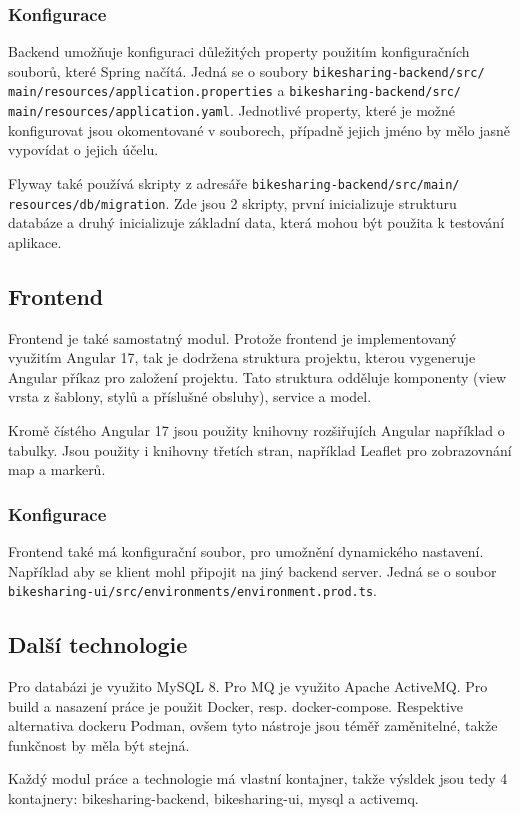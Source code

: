 \documentclass[12pt, letterpaper]{article}
\begin{document}
\subsubsection{Konfigurace}
Backend umožňuje konfiguraci důležitých property použitím konfiguračních souborů, které Spring načítá.
Jedná se o soubory \texttt{bikesharing-backend/src/
main/resources/application.properties} a 
\texttt{bikesharing-backend/src/
main/resources/application.yaml}. Jednotlivé property, které je možné konfigurovat jsou
okomentované v souborech, případně jejich jméno by mělo jasně vypovídat o jejich účelu.

Flyway také používá skripty z adresáře \texttt{bikesharing-backend/src/main/
resources/db/migration}. Zde jsou 2 skripty,
první inicializuje strukturu databáze a druhý inicializuje základní data, která mohou být použita k testování aplikace.
%
\subsection{Frontend}
Frontend je také samostatný modul. Protože frontend je implementovaný využitím Angular 17, tak je dodržena struktura 
projektu, kterou vygeneruje Angular příkaz pro založení projektu. Tato struktura odděluje komponenty 
(view vrsta z šablony, stylů a příslušné obsluhy), service a model.

Kromě čístého Angular 17 jsou použity knihovny rozšiřujích Angular například o tabulky. Jsou použity i knihovny 
třetích stran, například Leaflet pro zobrazovnání map a markerů.
%
\subsubsection{Konfigurace}
Frontend také má konfigurační soubor, pro umožnění dynamického nastavení. Například aby se klient mohl připojit na jiný
backend server. Jedná se o soubor \texttt{bikesharing-ui/src/environments/environment.prod.ts}.
%
\subsection{Další technologie}
Pro databázi je využito MySQL 8. Pro MQ je využito Apache ActiveMQ. Pro build a nasazení práce je použit Docker, resp.
docker-compose. Respektive alternativa dockeru Podman, ovšem tyto nástroje jsou téměř zaměnitelné, takže funkčnost by
měla být stejná.

Každý modul práce a technologie má vlastní kontajner, takže výsldek jsou tedy 4 kontajnery: bikesharing-backend, 
bikesharing-ui, mysql a activemq.
\end{document}
